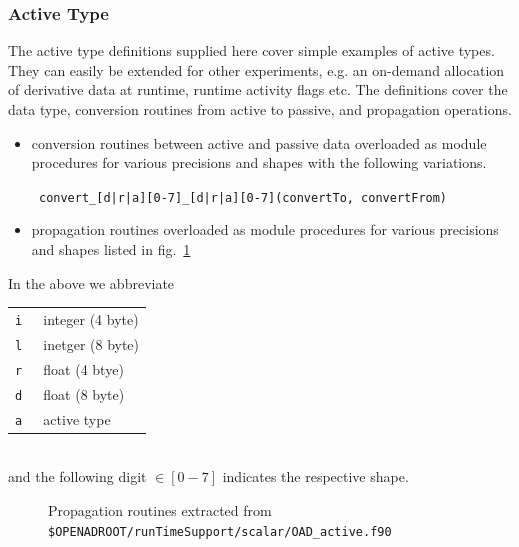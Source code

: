\documentclass{book}
\newcommand{\reffig}[1]{{fig.~\ref{#1}}}
\begin{document}
\subsubsection{Active Type}\label{sec:activeTypeDefs}
The active type definitions supplied here cover simple examples of active types. 
They can easily be extended for other experiments, e.g. an on-demand  allocation of 
derivative data at runtime, runtime activity flags etc. 
The definitions cover the data type, conversion routines from active to passive, 
and propagation operations.
\begin{itemize}
\item conversion routines between active and passive data overloaded as module procedures for various  precisions and shapes with the following variations.
\begin{center}
\tt 
convert\_[d|r|a][0-7]\_[d|r|a][0-7](convertTo, convertFrom)
\end{center}
\item propagation routines overloaded as module procedures for various precisions and shapes listed in \reffig{fig:runtimeActive}
\end{itemize}
In the above we abbreviate \\[1ex]
\hspace*{.3cm}
\begin{tabular}{c|l}
\tt i & integer (4 byte) \\ 
\tt l & inetger (8 byte) \\ 
\tt r & float (4 btye) \\ 
\tt d & float (8 byte) \\ 
\tt a & active type \\
\end{tabular}\\
and the following digit $\in [0-7]$ indicates the respective shape.
\begin{figure}
\begin{minipage}[t]{.48\linewidth}
\scriptsize
\end{minipage}
\hspace{.02\linewidth}
\begin{minipage}[t]{.48\linewidth}
\scriptsize
\end{minipage}
\caption{Propagation routines extracted from \lstinline{$OPENADROOT/runTimeSupport/scalar/OAD_active.f90} %
}\label{fig:runtimeActive}	
\end{figure}
\end{document}
